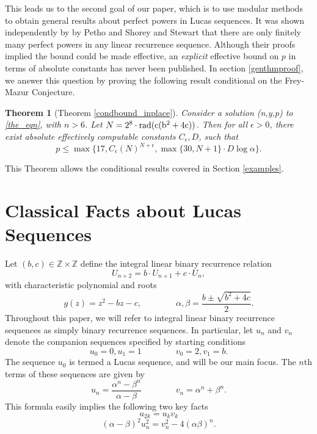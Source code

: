 \documentclass[12pt]{amsart}
\newtheorem{ithm}{Theorem}
\theoremstyle{definition}
\def\Z{{\mathbb Z}}
\newcommand{\rad}{\rm rad}
\begin{document}
This leads us to the second goal of our paper, which is to use modular methods to obtain general results about perfect powers in Lucas sequences. It was shown independently by by Petho \cite{petho82} and Shorey and Stewart \cite{shorey83} that there are only finitely many perfect powers in any linear recurrence sequence.  Although their proofs implied the bound could be made effective, an \emph{explicit} effective bound on $p$ in terms of absolute constants has never been published.  In section \ref{genthmproof}, we answer this question by proving the following result conditional on the Frey-Mazur Conjecture.

\begin{ithm}[Theorem \ref{condbound_inplace}]\label{condbound}
Consider a solution (n,y,p) to \eqref{the_eqn}, with $n > 6$. Let $N = 2^8 \cdot \rad(c(b^2+4c))$. Then for all $\epsilon > 0$, there exist absolute effectively computable constants $C_{\epsilon}, D$, such that
\[ p \leq \max\{17, C_{\epsilon} \left( N \right)^{N + \epsilon}, \max\{30, N+1\} \cdot D\log{\alpha} \}. \]
\end{ithm}
This Theorem allows the conditional results covered in Section \ref{examples}.

\section{Classical Facts about Lucas Sequences}\label{classicalresults}


Let $(b,c) \in \Z \times \Z$ define the integral linear binary recurrence relation
\[ U_{n+2} = b\cdot U_{n+1}+ c\cdot U_n, \]
with characteristic polynomial and roots
\[ g(z) = z^2 - bz - c, \qquad \qquad \alpha, \beta = \frac{b \pm \sqrt{b^2+4c}}{2}.\]
Throughout this paper, we will refer to integral linear binary recurrence sequences as simply binary recurrence sequences.  In particular, let $u_n$ and $v_n$ denote the companion sequences specified by starting conditions
\[ u_0 = 0, u_1 = 1 \qquad \qquad v_0 = 2, v_1 = b .\]
The sequence $u_0$ is termed a Lucas sequence, and will be our main focus.  The $n$th terms of these sequences are given by 
\begin{equation}\label{binetform} u_n = \frac{\alpha^n - \beta^n}{\alpha - \beta} \qquad \qquad v_n = \alpha^n +\beta^n. \end{equation}
This formula easily implies the following two key facts
\begin{equation}\label{fib2} u_{2k} = u_kv_k \end{equation}
\begin{equation}\label{gen_diophan}(\alpha - \beta)^2u_n^2 = v_n^2 - 4(\alpha\beta)^n. \end{equation}
\end{document}
